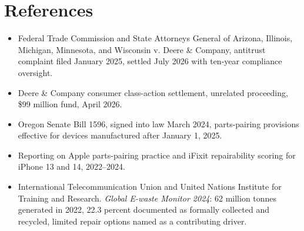 \documentclass[11pt]{article}
\begin{document}
\section*{References}
\begin{itemize}[nosep]
\item Federal Trade Commission and State Attorneys General of Arizona, Illinois, Michigan, Minnesota, and Wisconsin v. Deere \& Company, antitrust complaint filed January 2025, settled July 2026 with ten-year compliance oversight.
\item Deere \& Company consumer class-action settlement, unrelated proceeding, \$99 million fund, April 2026.
\item Oregon Senate Bill 1596, signed into law March 2024, parts-pairing provisions effective for devices manufactured after January 1, 2025.
\item Reporting on Apple parts-pairing practice and iFixit repairability scoring for iPhone 13 and 14, 2022--2024.
\item International Telecommunication Union and United Nations Institute for Training and Research. \emph{Global E-waste Monitor 2024}: 62 million tonnes generated in 2022, 22.3 percent documented as formally collected and recycled, limited repair options named as a contributing driver.
\end{itemize}
\end{document}

